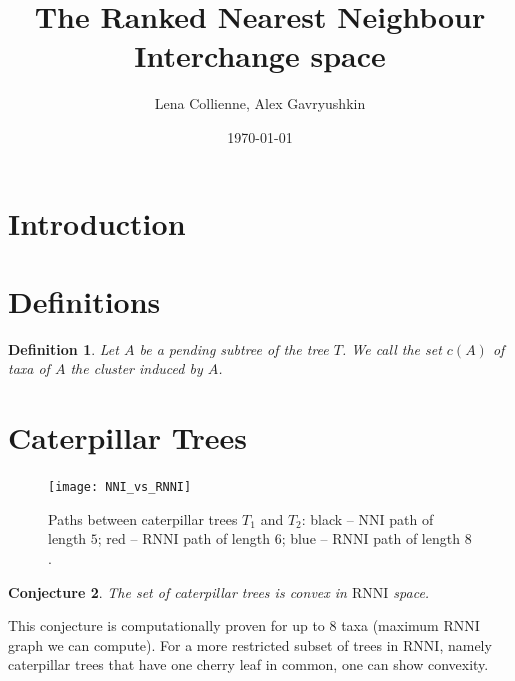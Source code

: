 \documentclass[11pt, a4paper]{article}
\title{The Ranked Nearest Neighbour Interchange space}
\date{\today}
\author{Lena Collienne, Alex Gavryushkin}
\newcommand{\nni}{\mathrm{NNI}}
\newcommand{\rnni}{\mathrm{RNNI}}
\newtheorem{definition}{Definition}
\newtheorem{conjecture}[definition]{Conjecture}
\begin{document}
\maketitle

\begin{abstract}

\end{abstract}


\section{Introduction}

\section{Definitions}






\begin{definition}
	Let $A$ be a pending subtree of the tree $T$.
	We call the set $c(A)$ of taxa of $A$ the \emph{cluster} induced by $A$.
\end{definition}

\section{Caterpillar Trees}

\begin{figure}[H]
	\centering
	\texttt{[image: NNI\_vs\_RNNI]}
	\caption{Paths between caterpillar trees $T_1$ and $T_2$: black -- $\nni$ path of length $5$; red -- $\rnni$ path of length $6$; blue -- $\rnni$ path of length $8$.}
	\label{NNI_vs_RNNI}
\end{figure}

\begin{conjecture}
	The set of caterpillar trees is convex in $\rnni$ space.
\end{conjecture}

This conjecture is computationally proven for up to $8$ taxa (maximum $\rnni$ graph we can compute).
For a more restricted subset of trees in $\rnni$, namely caterpillar trees that have one cherry leaf in common, one can show convexity.
\end{document}
